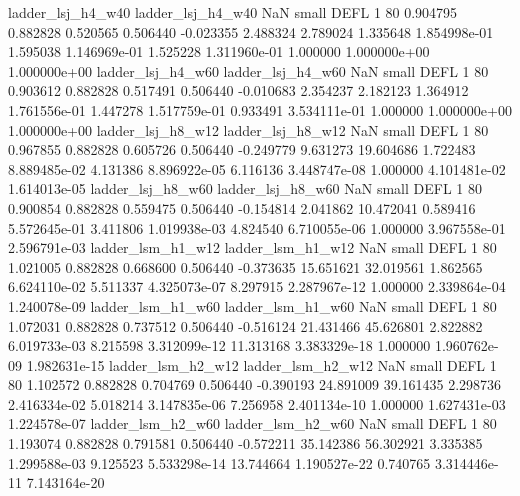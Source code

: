       ladder_lsj_h4_w40        ladder_lsj_h4_w40                   NaN      small     DEFL                 1 80 0.904795       0.882828 0.520565       0.506440   -0.023355      2.488324      2.789024     1.335648   1.854998e-01  1.595038 1.146969e-01     1.525228   1.311960e-01            1.000000    1.000000e+00        1.000000e+00
       ladder_lsj_h4_w60        ladder_lsj_h4_w60                   NaN      small     DEFL                 1 80 0.903612       0.882828 0.517491       0.506440   -0.010683      2.354237      2.182123     1.364912   1.761556e-01  1.447278 1.517759e-01     0.933491   3.534111e-01            1.000000    1.000000e+00        1.000000e+00
       ladder_lsj_h8_w12        ladder_lsj_h8_w12                   NaN      small     DEFL                 1 80 0.967855       0.882828 0.605726       0.506440   -0.249779      9.631273     19.604686     1.722483   8.889485e-02  4.131386 8.896922e-05     6.116136   3.448747e-08            1.000000    4.101481e-02        1.614013e-05
       ladder_lsj_h8_w60        ladder_lsj_h8_w60                   NaN      small     DEFL                 1 80 0.900854       0.882828 0.559475       0.506440   -0.154814      2.041862     10.472041     0.589416   5.572645e-01  3.411806 1.019938e-03     4.824540   6.710055e-06            1.000000    3.967558e-01        2.596791e-03
       ladder_lsm_h1_w12        ladder_lsm_h1_w12                   NaN      small     DEFL                 1 80 1.021005       0.882828 0.668600       0.506440   -0.373635     15.651621     32.019561     1.862565   6.624110e-02  5.511337 4.325073e-07     8.297915   2.287967e-12            1.000000    2.339864e-04        1.240078e-09
       ladder_lsm_h1_w60        ladder_lsm_h1_w60                   NaN      small     DEFL                 1 80 1.072031       0.882828 0.737512       0.506440   -0.516124     21.431466     45.626801     2.822882   6.019733e-03  8.215598 3.312099e-12    11.313168   3.383329e-18            1.000000    1.960762e-09        1.982631e-15
       ladder_lsm_h2_w12        ladder_lsm_h2_w12                   NaN      small     DEFL                 1 80 1.102572       0.882828 0.704769       0.506440   -0.390193     24.891009     39.161435     2.298736   2.416334e-02  5.018214 3.147835e-06     7.256958   2.401134e-10            1.000000    1.627431e-03        1.224578e-07
       ladder_lsm_h2_w60        ladder_lsm_h2_w60                   NaN      small     DEFL                 1 80 1.193074       0.882828 0.791581       0.506440   -0.572211     35.142386     56.302921     3.335385   1.299588e-03  9.125523 5.533298e-14    13.744664   1.190527e-22            0.740765    3.314446e-11        7.143164e-20

